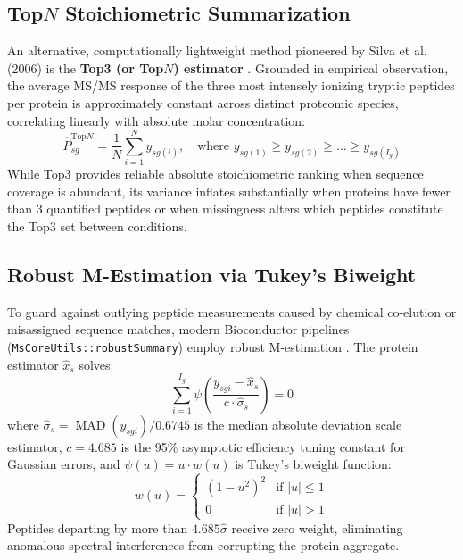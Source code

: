 \documentclass[11pt,oneside]{book}
\begin{document}
\subsection{\texorpdfstring{Top$N$}{TopN} Stoichiometric Summarization}
An alternative, computationally lightweight method pioneered by Silva et al. (2006) is the \textbf{Top3 (or Top$N$) estimator} \cite{silva2006absolute}. Grounded in empirical observation, the average MS/MS response of the three most intensely ionizing tryptic peptides per protein is approximately constant across distinct proteomic species, correlating linearly with absolute molar concentration:
\begin{equation}
\hat{P}_{sg}^{\text{Top}N} = \frac{1}{N} \sum_{i=1}^N y_{s g (i)}, \quad \text{where } y_{s g (1)} \ge y_{s g (2)} \ge \dots \ge y_{s g (I_g)}
\label{eq:top3_formula}
\end{equation}
While Top3 provides reliable absolute stoichiometric ranking when sequence coverage is abundant, its variance inflates substantially when proteins have fewer than 3 quantified peptides or when missingness alters which peptides constitute the Top3 set between conditions.

\subsection{Robust M-Estimation via Tukey's Biweight}
To guard against outlying peptide measurements caused by chemical co-elution or misassigned sequence matches, modern Bioconductor pipelines (\texttt{MsCoreUtils::robustSummary}) employ robust M-estimation \cite{gatto2023qfeatures}. The protein estimator $\hat{x}_s$ solves:
\begin{equation}
\sum_{i=1}^{I_g} \psi\left( \frac{y_{sgi} - \hat{x}_s}{c \cdot \hat{\sigma}_s} \right) = 0
\label{eq:m_estimator}
\end{equation}
where $\hat{\sigma}_s = \operatorname{MAD}(y_{sgi}) / 0.6745$ is the median absolute deviation scale estimator, $c = 4.685$ is the 95\% asymptotic efficiency tuning constant for Gaussian errors, and $\psi(u) = u \cdot w(u)$ is Tukey's biweight function:
\begin{equation}
w(u) = \begin{cases}
\left( 1 - u^2 \right)^2 & \text{if } |u| \le 1 \\
0 & \text{if } |u| > 1
\end{cases}
\label{eq:tukey_biweight}
\end{equation}
Peptides departing by more than $4.685 \hat{\sigma}$ receive zero weight, eliminating anomalous spectral interferences from corrupting the protein aggregate.
\end{document}
